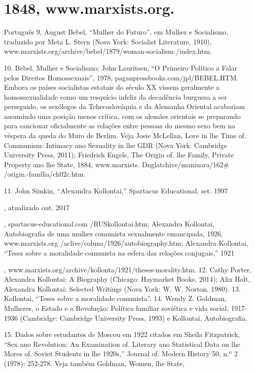 \section{1848, www.marxists.org.}
 \par 
Português 9, August Bebel, “Mulher do Futuro”, em Mulher e Socialismo, traduzido por Meta L. Stern (Nova York: Socialist Literature, 1910), www.marxists.org/archive/bebel/1879/woman-socialism /index.htm.
 \par 
10. Bebel, Mulher e Socialismo; John Lauritsen, “O Primeiro Político a Falar pelos Direitos Homossexuais”, 1978, paganpressbooks.com/jpl/BEBEL.HTM. Embora os países socialistas estatais do século XX vissem geralmente a homossexualidade como um resquício infeliz da decadência burguesa a ser perseguido, os sexólogos da Tchecoslováquia e da Alemanha Oriental acabariam assumindo uma posição menos crítica, com os alemães orientais se preparando para sancionar oficialmente as relações entre pessoas do mesmo sexo bem na véspera da queda do Muro de Berlim. Veja Josie McLellan, Love in lhe Time of. Communism: Intimacy ano Sexuality in lhe GDR (Nova York: Cambridge University Press, 2011); Friedrich Engels, The Origin of. lhe Family, Private Property ano lhe State, 1884, www.marxists. Dnglatchive/maniuara/162# /origin.-família/ch02c.htm.
 \par 
11. John Simkin, “Alexandra Kollontai,” Spartacus Educational, set. {\color{blue} 1997 } {\par} , atualizado out. {\color{blue} 2017 } {\par} , spartacus-educational.com /RUSkollontai.htm; Alexandra Kollontai, Autobiografia de uma mulher comunista sexualmente emancipada, 1926, www.marxists.org /aclive/coluna/1926/autobiography.htm; Alexandra Kollontai, “Teses sobre a moralidade comunista na esfera das relações conjugais,” {\color{blue} 1921 } {\par} , www.marxists.org/archive/kollonta/1921/theses-morality.htm. {\color{blue}12}. Cathy Porter, Alexandra Kollontai: A Biography (Chicago: Haymarket Books, 2014); Alix Holt, Alexandra Kollontai: Selected Writings (Nova York: W. W. Norton, 1980). {\color{blue}13}. Kollontai, “Teses sobre a moralidade comunista”. {\color{blue}14}. Wendy Z. Goldman, Mulheres, o Estado e a Revolução: Política familiar soviética e vida social, 1917-1936 (Cambridge: Cambridge University Press, 1993) e Kollontai, Autobiografia.
 \par 
15. Dados sobre estudantes de Moscou em 1922 citados em Sheila Fitzpatrick, “Sex ano Revolution: An Examination of. Literary ano Statistical Data on lhe Mores of. Soviet Students in lhe 1920s,” Journal of. Modern History 50, n.º {\color{blue}2} (1978): 252-278. Veja também Goldman, Women, lhe State,
